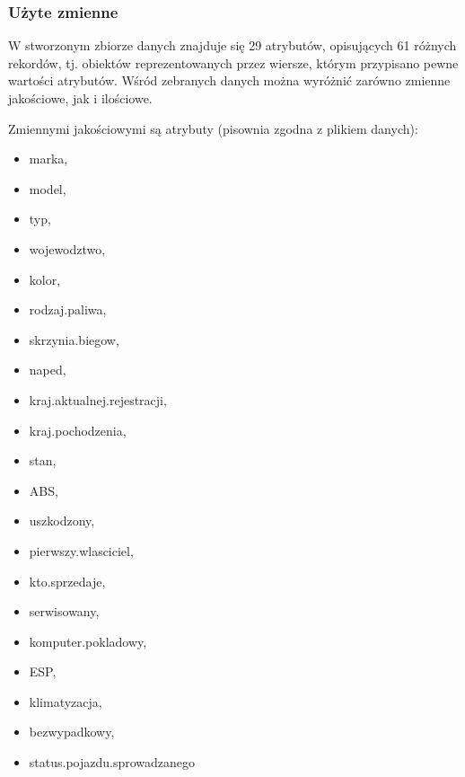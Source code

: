 \documentclass[12pt,a4paper]{report}
\begin{document}
\subsubsection{Użyte zmienne}


W stworzonym zbiorze danych znajduje się 29 atrybutów, opisujących 61 różnych rekordów, tj. obiektów reprezentowanych przez wiersze, którym przypisano pewne wartości atrybutów. Wśród zebranych danych można wyróżnić zarówno zmienne jakościowe, jak i ilościowe. 

Zmiennymi jakościowymi są atrybuty (pisownia zgodna z plikiem danych):
\begin{multicols}{3} 
\begin{itemize}
	\item marka,
	\item model,
	\item typ,
	\item wojewodztwo,
	\item kolor,
	\item rodzaj.paliwa,
	\item skrzynia.biegow,
	\item naped,
	\item kraj.aktualnej.rejestracji,%
	\item kraj.pochodzenia,%
	\item stan,
	\item ABS,
	\item uszkodzony,
	\item pierwszy.wlasciciel,%
	\item kto.sprzedaje,%
	\item serwisowany,%
	\item komputer.pokladowy,%
	\item ESP,
	\item klimatyzacja,%
	\item bezwypadkowy,%
	\item status.pojazdu.sprowadzanego%
\end{itemize}
\end{multicols}

%
\end{document}
